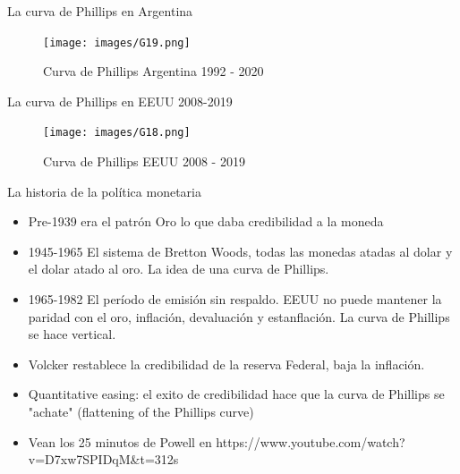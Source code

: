 \documentclass{beamer}
\begin{document}
\begin{frame}{La curva de Phillips en Argentina}
    \begin{figure} [H]   
  \centering
  \texttt{[image: images/G19.png]}
      \caption{Curva de Phillips Argentina 1992 - 2020}
  \label{fig:C38.10}
\end{figure}
\end{frame}


\begin{frame}{La curva de Phillips en EEUU 2008-2019}
    \begin{figure} [H]   
  \centering
  \texttt{[image: images/G18.png]}
      \caption{Curva de Phillips EEUU 2008 - 2019}
  \label{fig:C38.11}
\end{figure}
\end{frame}






\begin{frame}{La historia de la política monetaria}
    


\begin{itemize}
    \item Pre-1939 era el patrón Oro lo que daba credibilidad a la moneda
    \item 1945-1965 El sistema de Bretton Woods, todas las monedas atadas al dolar y el dolar atado al oro. La idea de una curva de Phillips. 
    \item 1965-1982 El período de emisión sin respaldo. EEUU no puede mantener la paridad con el oro, inflación, devaluación y estanflación. La curva de Phillips se hace vertical.
    \item Volcker restablece la credibilidad de la reserva Federal, baja la inflación.
    \item Quantitative easing: el exito de credibilidad hace que la curva de Phillips se "achate" (flattening of the Phillips curve) 
    \item Vean los 25 minutos de Powell en https://www.youtube.com/watch?v=D7xw7SPIDqM&t=312s
\end{itemize}    

\end{frame}




\end{document}
